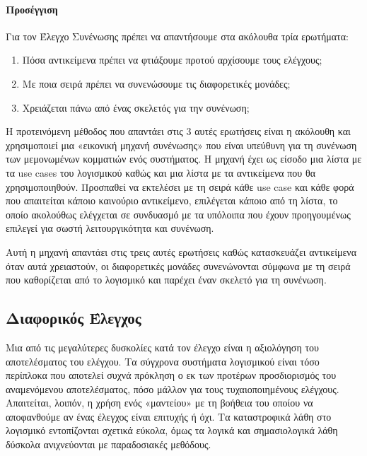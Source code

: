 \documentclass[12pt]{article}
\begin{document}
\paragraph{Προσέγγιση}

Για τον Έλεγχο Συνένωσης πρέπει να απαντήσουμε στα ακόλουθα τρία ερωτήματα:

\begin{enumerate}
  \item Πόσα αντικείμενα πρέπει να φτιάξουμε προτού αρχίσουμε τους ελέγχους;
  \item Με ποια σειρά πρέπει να συνενώσουμε τις διαφορετικές μονάδες;
  \item Χρειάζεται πάνω από ένας σκελετός για την συνένωση;
\end{enumerate}

\par Η προτεινόμενη μέθοδος που απαντάει στις 3 αυτές ερωτήσεις είναι η ακόλουθη και χρησιμοποιεί μια «εικονική μηχανή συνένωσης» που είναι υπεύθυνη για τη συνένωση των μεμονωμένων κομματιών ενός συστήματος. Η μηχανή έχει ως είσοδο μια λίστα με τα use cases του λογισμικού καθώς και μια λίστα με τα αντικείμενα που θα χρησιμοποιηθούν. Προσπαθεί να εκτελέσει με τη σειρά κάθε use case και κάθε φορά που απαιτείται κάποιο καινούριο αντικείμενο, επιλέγεται κάποιο από τη λίστα, το οποίο ακολούθως ελέγχεται σε συνδυασμό με τα υπόλοιπα που έχουν προηγουμένως επιλεγεί για σωστή λειτουργικότητα και συνένωση.

\par Αυτή η μηχανή απαντάει στις τρεις αυτές ερωτήσεις καθώς κατασκευάζει αντικείμενα όταν αυτά χρειαστούν, οι διαφορετικές μονάδες συνενώνονται σύμφωνα με τη σειρά που καθορίζεται από το λογισμικό και παρέχει έναν σκελετό για τη συνένωση.

\subsection{Διαφορικός Έλεγχος}

Μια από τις μεγαλύτερες δυσκολίες κατά τον έλεγχο είναι η αξιολόγηση του αποτελέσματος του ελέγχου. Τα σύγχρονα συστήματα λογισμικού είναι τόσο περίπλοκα που αποτελεί συχνά πρόκληση ο εκ των προτέρων προσδιορισμός του αναμενόμενου αποτελέσματος, πόσο μάλλον για τους τυχαιοποιημένους ελέγχους. Απαιτείται, λοιπόν, η χρήση ενός «μαντείου» με τη βοήθεια του οποίου να αποφανθούμε αν ένας έλεγχος είναι επιτυχής ή όχι. Τα καταστροφικά λάθη στο λογισμικό εντοπίζονται σχετικά εύκολα, όμως τα λογικά και σημασιολογικά λάθη δύσκολα ανιχνεύονται με παραδοσιακές μεθόδους.
\end{document}
